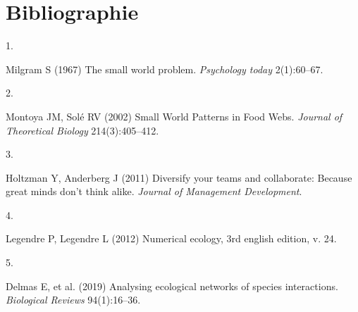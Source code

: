 \documentclass[9pt,twocolumn,twoside,]{pnas-new}
\newlength{\cslhangindent}
\newlength{\csllabelwidth}
\newlength{\cslentryspacingunit} %
\newenvironment{CSLReferences}[2] %
 {%
  \setlength{\parindent}{0pt}
  \ifodd #1
  \let\oldpar\par
  \def\par{\hangindent=\cslhangindent\oldpar}
  \fi
  \setlength{\parskip}{#2\cslentryspacingunit}
 }%
 {}
\newcommand{\CSLLeftMargin}[1]{\parbox[t]{\csllabelwidth}{#1}}
\newcommand{\CSLRightInline}[1]{\parbox[t]{\linewidth - \csllabelwidth}{#1}\break}
\begin{document}
\newpage

\hypertarget{bibliographie}{%
\section*{Bibliographie}\label{bibliographie}}

\hypertarget{refs}{}
\begin{CSLReferences}{0}{0}
\leavevmode\hypertarget{ref-milgram1967small}{}%
\CSLLeftMargin{1. }
\CSLRightInline{Milgram S (1967) The small world problem.
\emph{Psychology today} 2(1):60--67.}

\leavevmode\hypertarget{ref-montoya2002small}{}%
\CSLLeftMargin{2. }
\CSLRightInline{Montoya JM, Solé RV (2002) Small {World} {Patterns} in
{Food} {Webs}. \emph{Journal of Theoretical Biology} 214(3):405--412.}

\leavevmode\hypertarget{ref-holtzman2011diversify}{}%
\CSLLeftMargin{3. }
\CSLRightInline{Holtzman Y, Anderberg J (2011) Diversify your teams and
collaborate: Because great minds don't think alike. \emph{Journal of
Management Development}.}

\leavevmode\hypertarget{ref-legendre2012numerical}{}%
\CSLLeftMargin{4. }
\CSLRightInline{Legendre P, Legendre L (2012) Numerical ecology, 3rd
english edition, v. 24.}

\leavevmode\hypertarget{ref-delmas2019analysing}{}%
\CSLLeftMargin{5. }
\CSLRightInline{Delmas E, et al. (2019) Analysing ecological networks of
species interactions. \emph{Biological Reviews} 94(1):16--36.}

\end{CSLReferences}



% 
\end{document}

